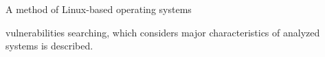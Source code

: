 \titele{\tit}{\aut}{\auf}{\leftkol}{\rightkol}





\vspace*{-3pt}








\noindent


A method of Linux-based operating systems 


vulnerabilities searching, which considers major characteristics of analyzed systems is described.





\vspace*{-5pt}










\pagebreak

















\def\leftkol{\ } %


\def\rightkol{\ } %





 





\def\tit{ATTACKS ON THE CENTRALIZED SYSTEMS OF~INTRUSION~DETECTION}





\def\aut{A.\,A.~Timonina$^1$ and E.\,E.~Timonina$^2$}





\def\auf{$^1$Faculty of Computational Mathematics and Cybernetics, 


M.\,V.~Lomonosov\\


$\hphantom{^1}$Moscow State University, toniat@yandex.ru\\[1pt]


$^2$IPI RAN,  eltimon@yandex.ru}









